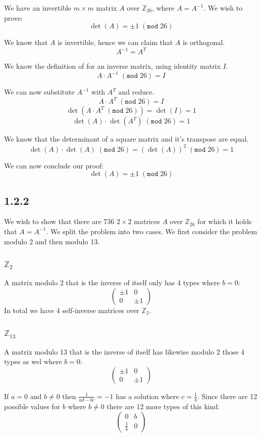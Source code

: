\documentclass[11pt]{report}
\begin{document}
We have an invertible $m \times m$ matrix $A$ over $\mathbb{Z}_{26}$, where $A = A^{-1}$. We wish to prove:
$$\det(A) = \pm 1\;(\mathtt{mod}\;26)$$

We know that $A$ is invertible, hence we can claim that $A$ is orthogonal.
$$A^{-1}=A^T$$

We know the definition of for an inverse matrix, using identity matrix $I$.
$$A \cdot A^{-1}\;(\mathtt{mod}\;26) = I$$

We can now substitute $A^{-1}$ with $A^T$ and reduce.
$$A \cdot A^T\;(\mathtt{mod}\;26)= I$$
$$\det(A \cdot A^T\;(\mathtt{mod}\;26)) = \det(I) = 1$$
$$\det(A) \cdot \det(A^T)\;(\mathtt{mod}\;26) = 1$$

We know that the determinant of a square matrix and it's transpose are equal.
$$\det(A) \cdot \det(A)\;(\mathtt{mod}\;26) = (\det(A))^2\;(\mathtt{mod}\;26) = 1$$

We can now conclude our proof:
$$\det(A) = \pm 1\;(\mathtt{mod}\;26)$$

\subsection*{1.2.2}
We wish to show that there are 736 $2 \times 2$ matrices $A$ over $\mathbb{Z}_{26}$ for which it holds that $A= A^{-1}$. We split the problem into two cases. We first consider the problem modulo 2 and then modulo 13.

\subsubsection*{$\mathbb{Z}_{2}$}
A matrix modulo 2 that is the inverse of itself only has 4 types where $b = 0$:
$$\begin{pmatrix}
\pm 1 & 0\\
0 & \pm 1
\end{pmatrix}$$
In total we have 4 self-inverse matrices over $\mathbb{Z}_{2}$.

\subsubsection*{$\mathbb{Z}_{13}$}
A matrix modulo 13 that is the inverse of itself has likewise modulo 2 those 4 types as wel where $b = 0$:\\
$$\begin{pmatrix}
\pm 1 & 0\\
0 & \pm 1
\end{pmatrix}$$

If $a = 0$ and $b \neq 0$ then $\frac{1}{ad - bc} = -1$ has a solution where $c=\frac{1}{b}$. Since there are 12 possible values for $b$ where $b \neq 0$ there are 12 more types of this kind:\\
$$\begin{pmatrix}
0 & b\\
\frac{1}{b} & 0
\end{pmatrix}$$
\end{document}
